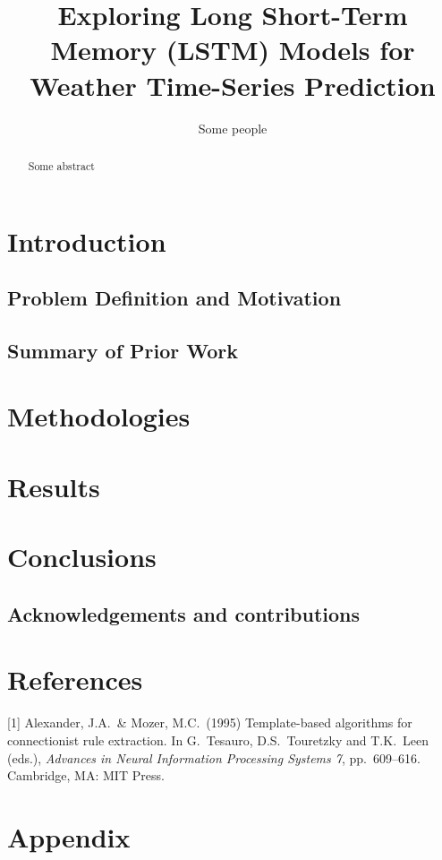 \documentclass{article}
\title{Exploring Long Short-Term Memory (LSTM) Models for Weather Time-Series Prediction}
\author{Some people}
\begin{document}
\maketitle


\begin{abstract}
  Some abstract
\end{abstract}


\section*{Introduction}
\subsection*{Problem Definition and Motivation}
\subsection*{Summary of Prior Work}
\section*{Methodologies}
\section*{Results}
\section*{Conclusions}
\subsection*{Acknowledgements and contributions}
\section*{References}

\medskip

{
\small

[1] Alexander, J.A.\ \& Mozer, M.C.\ (1995) Template-based algorithms for
connectionist rule extraction. In G.\ Tesauro, D.S.\ Touretzky and T.K.\ Leen
(eds.), {\it Advances in Neural Information Processing Systems 7},
pp.\ 609--616. Cambridge, MA: MIT Press.

}



\appendix
\section*{Appendix}
\end{document}
